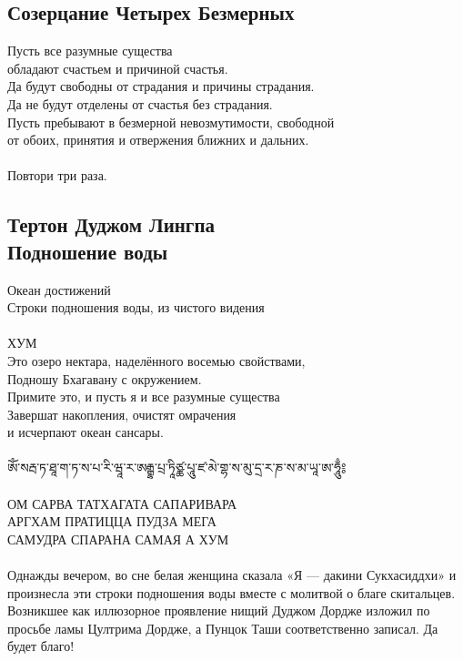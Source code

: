 \subsection{Созерцание Четырех Безмерных}

Пусть все разумные существа \\ \indent обладают счастьем и причиной счастья.\\
Да будут свободны от страдания и причины страдания.\\
Да не будут отделены от счастья без страдания.\\
Пусть пребывают в безмерной невозмутимости, свободной \\ \indent
 от обоих, принятия и отвержения ближних и дальних.\\
\\
\indent Повтори три раза.

\subsection{Тертон Дуджом Лингпа \\Подношение воды}

\large Океан достижений \\
\normalsize Строки подношения воды, из чистого видения\\
\\
ХУМ\\
Это озеро нектара, наделённого восемью свойствами,\\
Подношу Бхагавану с окружением.\\
Примите это, и пусть я и все разумные существа\\
Завершат накопления, очистят омрачения \\ \indent и исчерпают океан сансары.\\
\\
\ti
ཨོཾ་སརྦ་ཏ་ཐཱ་ག་ཏ་ས་པ་རི་ཝཱ་ར་ཨརྒྷ་པྲ་ཏཱིཙྪ་པཱུ་ཛ་མེ་གྷ་ས་མུ་དྲ་ར་ཎ་ས་མ་ཡཱ་ཨ་ཧཱུྃ༔\\
\\
\ru
ОМ САРВА ТАТХАГАТА САПАРИВАРА\\
АРГХАМ ПРАТИЦЦА ПУДЗА МЕГА \\
САМУДРА СПАРАНА САМАЯ А ХУМ\\
\\
\scriptsize
Однажды вечером, во сне белая женщина сказала «Я — дакини Сукхасиддхи»
и произнесла эти строки подношения воды вместе с молитвой о благе скитальцев.
Возникшее как иллюзорное проявление нищий Дуджом Дордже изложил
по просьбе ламы Цултрима Дордже, а Пунцок Таши соответственно записал.
Да будет благо!\normalsize

